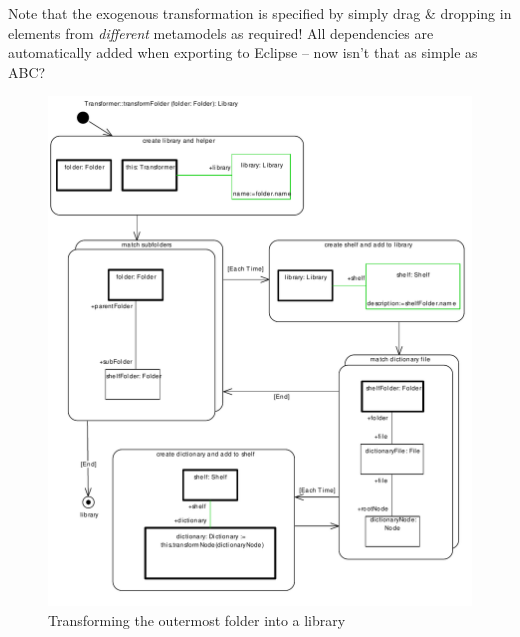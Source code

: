 \begin{enumerate}
\clearpage
Note that the exogenous transformation is specified by simply drag \& dropping in elements from \emph{different} metamodels as required!
All dependencies are automatically added when exporting to Eclipse -- now isn't that as simple as ABC?
\begin{figure}[!htbp]
\begin{center}
 \includegraphics[width=\textwidth]{pics/moca/3MocaTreeToModel/transformFolderPrintPdf}
  \caption{Transforming the outermost folder into a library}
  \label{fig:moca-transformFolder}
\end{center}
\end{figure}

\clearpage


\end{enumerate}

